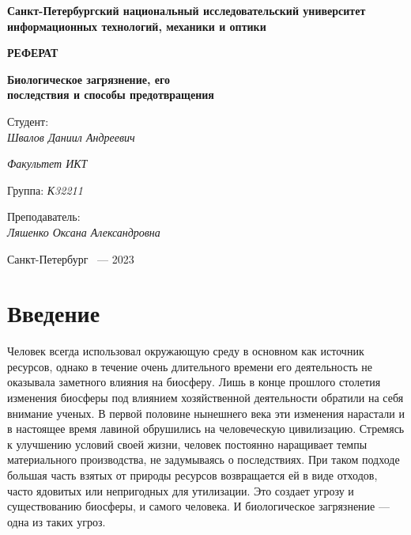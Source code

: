 \documentclass[a4paper, 12pt]{extarticle}
\begin{document}
\begin{titlepage}
    \vspace{0pt plus2fill}
    \noindent

    \vspace{0pt plus6fill}
    \begin{center}
        \textbf{\large{Санкт-Петербургский национальный исследовательский университет
                информационных технологий, механики и оптики}}

        \vspace{0pt plus3fill}

        \textbf{\LARGE{РЕФЕРАТ}}

        \vspace{0pt plus1fill}

        \textbf{\Large{Биологическое загрязнение, его \\ последствия и способы предотвращения}}

    \end{center}

    \vspace{0pt plus8fill}
    \begin{flushright}
        Студент: \\
        \textit{Швалов Даниил Андреевич}

        \textit{Факультет ИКТ}

        Группа: \textit{К32211}

        Преподаватель: \\
        \textit{Ляшенко Оксана Александровна}
    \end{flushright}

    \vspace{0pt plus4fill}
    \begin{center}
        {Санкт-Петербург ~--- 2023}
    \end{center}
\end{titlepage}

\tableofcontents
\newpage

\section{Введение}

Человек всегда использовал окружающую среду в основном как источник ресурсов, однако в течение очень длительного времени его деятельность не оказывала заметного влияния на биосферу. Лишь в конце прошлого столетия изменения биосферы под влиянием хозяйственной деятельности обратили на себя внимание ученых. В первой половине нынешнего века эти изменения нарастали и в настоящее время лавиной обрушились на человеческую цивилизацию. Стремясь к улучшению условий своей жизни, человек постоянно наращивает темпы материального производства, не задумываясь о последствиях. При таком подходе большая часть взятых от природы ресурсов возвращается ей в виде отходов, часто ядовитых или непригодных для утилизации. Это создает угрозу и существованию биосферы, и самого человека. И биологическое загрязнение --- одна из таких угроз.
\end{document}
